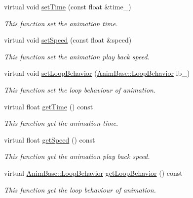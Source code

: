\begin{DoxyCompactItemize}
\item 
virtual void \hyperlink{class_magnum_1_1_skeletal_animation_ab66c2e42b4c6f8fec606286d26f6999c}{set\+Time} (const float \&time\+\_\+)
\begin{DoxyCompactList}\small\item\em This function set the animation time. \end{DoxyCompactList}\item 
virtual void \hyperlink{class_magnum_1_1_skeletal_animation_a18dde64242b5ade75cc0f489c36edf8c}{set\+Speed} (const float \&speed)
\begin{DoxyCompactList}\small\item\em This function set the animation play back speed. \end{DoxyCompactList}\item 
virtual void \hyperlink{class_magnum_1_1_skeletal_animation_a180cd06d23c15eb2c6460d965464a452}{set\+Loop\+Behavior} (\hyperlink{class_magnum_1_1_anim_base_ad6b3de9518d395df5ca9865f268ec581}{Anim\+Base\+::\+Loop\+Behavior} lb\+\_\+)
\begin{DoxyCompactList}\small\item\em This function set the loop behaviour of animation. \end{DoxyCompactList}\item 
virtual float \hyperlink{class_magnum_1_1_skeletal_animation_a53ce3b89b692b215984779c74541bc2f}{get\+Time} () const 
\begin{DoxyCompactList}\small\item\em This function get the animation time. \end{DoxyCompactList}\item 
virtual float \hyperlink{class_magnum_1_1_skeletal_animation_a129c204122644a54e596d76747485c0a}{get\+Speed} () const 
\begin{DoxyCompactList}\small\item\em This function get the animation play back speed. \end{DoxyCompactList}\item 
virtual \hyperlink{class_magnum_1_1_anim_base_ad6b3de9518d395df5ca9865f268ec581}{Anim\+Base\+::\+Loop\+Behavior} \hyperlink{class_magnum_1_1_skeletal_animation_ab5cf2215842e3cd4dfa6ce789dcb6b47}{get\+Loop\+Behavior} () const 
\begin{DoxyCompactList}\small\item\em This function get the loop behaviour of animation. \end{DoxyCompactList}\item 

\end{DoxyCompactItemize}
